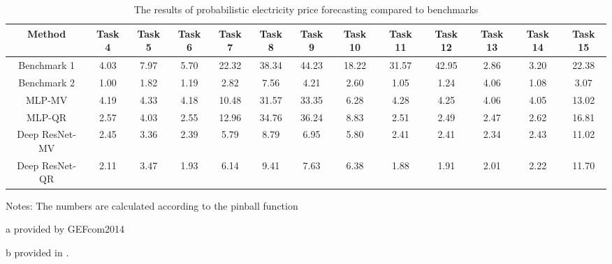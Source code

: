 \documentclass[review]{elsarticle}
\begin{document}
  \begin{table}[H]
    \caption{The results of probabilistic electricity price forecasting compared to benchmarks}
    \begin{adjustbox}{width=\textwidth}
    \begin{threeparttable}
      \begin{center}
        \begin{tabular}{ccccccccccccc}
          \hline
          Method & Task 4 & Task 5& Task 6 & Task 7& Task 8 & Task 9& Task 10 & Task 11& Task 12 & Task 13 & Task 14 & Task 15\\
          \hline
          Benchmark 1 \tnote{a} & 4.03 & 7.97 & 5.70 & 22.32 & 38.34 & 44.23 & 18.22 & 31.57 & 42.95 & 2.86 & 3.20 & 22.38\\
          Benchmark 2 \tnote{b} & 1.00 & 1.82 & 1.19 & 2.82 & 7.56 & 4.21 & 2.60 & 1.05 & 1.24 & 4.06 & 1.08 & 3.07 \\
          \hline
          MLP-MV & 4.19 & 4.33 & 4.18 & 10.48 & 31.57 & 33.35 & 6.28 & 4.28 & 4.25 & 4.06 & 4.05 & 13.02\\
          MLP-QR & 2.57 & 4.03 & 2.55 & 12.96 & 34.76 & 36.24 & 8.83 & 2.51 & 2.49 & 2.47 & 2.62 & 16.81\\
          Deep ResNet-MV& 2.45 & 3.36 & 2.39 & 5.79 & 8.79 & 6.95 & 5.80 & 2.41 & 2.41 & 2.34 & 2.43 & 11.02 \\
          Deep ResNet-QR& 2.11& 3.47& 1.93 & 6.14 & 9.41 & 7.63 & 6.38 & 1.88 & 1.91 & 2.01 & 2.22 &11.70 \\
          \hline
        \end{tabular}
        \begin{tablenotes}
          Notes: The numbers are calculated according to the pinball function
          \item[a] provided by GEFcom2014
          \item[b] provided in \cite{Maciejowska2016}.
        \end{tablenotes}
        \end{center}
    \end{threeparttable}
    \end{adjustbox}
    \label{table:result_pinball}
  \end{table}
\end{document}
